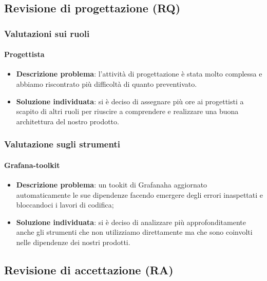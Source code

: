 		\subsection{Revisione di progettazione (RQ)}
		\subsubsection{Valutazioni sui ruoli}
			\paragraph{Progettista}
				\begin{itemize}
					\item \textbf{Descrizione problema}: l'attività di progettazione è stata molto complessa e abbiamo riscontrato più difficoltà di quanto preventivato.
					\item \textbf{Soluzione individuata}: si è deciso di assegnare più ore ai progettisti a scapito di altri ruoli per riuscire a comprendere e realizzare una buona architettura del nostro prodotto\glo.
				\end{itemize}
		\subsubsection{Valutazione sugli strumenti}
			\paragraph{Grafana-toolkit}
				\begin{itemize}
					\item \textbf{Descrizione problema}: un tookit di Grafana\glosp ha aggiornato automaticamente le sue dipendenze facendo emergere degli errori inaspettati e bloccandoci i lavori di codifica;
					\item \textbf{Soluzione individuata}: si è deciso di analizzare più approfonditamente anche gli strumenti che non utilizziamo direttamente ma che sono coinvolti nelle dipendenze dei nostri prodotti.
				\end{itemize}
		\subsection{Revisione di accettazione (RA)}
